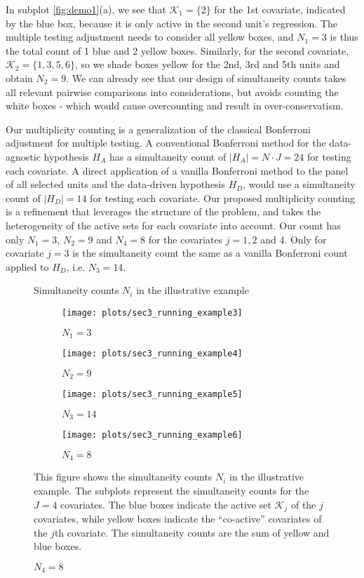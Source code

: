 \documentclass[11pt]{article}
\newcommand\tcaptab[1]{\captionsetup{position=top, font=normalsize, labelfont=bf, textfont=normalfont, justification=centering, margin=0mm, aboveskip=1mm, belowskip=0mm, labelsep=colon, singlelinecheck=false}\caption{#1}}
\newcommand\bnotetab[1]{\captionsetup{position=bottom, font=footnotesize,  textfont=normalfont, margin=1mm, skip=2mm, justification=justified, singlelinecheck=false}\caption*{#1}}
\begin{document}
In subplot \ref{fig:demo1}(a), we see that $\mathcal{K}_1=\{2\}$ for the 1st covariate, indicated by the blue box, because it is only active in the second unit's regression. The multiple testing adjustment needs to consider all yellow boxes, and $N_1=3$ is thus the total count of 1 blue and 2 yellow boxes. Similarly, for the second covariate, $\mathcal{K}_2=\{1,3,5,6\}$, so we shade boxes yellow for the 2nd, 3rd and 5th units and obtain $N_2=9$. We can already see that our design of simultaneity counts takes all relevant pairwise comparisons into considerations, but avoids counting the white boxes - which would cause overcounting and result in over-conservatism. 

Our multiplicity counting is a generalization of the classical Bonferroni adjustment for multiple testing. A conventional Bonferroni method for the data-agnostic hypothesis $H_A$ has a simultaneity count of $|H_A|=N\cdot J=24$ for testing each covariate. A direct application of a vanilla Bonferroni method to the panel of all selected units and the data-driven hypothesis $H_D$, would use a simultaneity count of $|H_D|=14$ for testing each covariate. Our proposed multiplicity counting is a refinement that leverages the structure of the problem, and takes the heterogeneity of the active sets for each covariate into account. Our count has only $N_1=3$, $N_2=9$ and $N_4=8$ for the covariates $j=1,2$ and $4$. Only for covariate $j=3$ is the simultaneity count the same as a vanilla Bonferroni count applied to $H_D$, i.e. $N_3=14$. 

\begin{figure}[t!]
	\tcaptab{Simultaneity counts $N_i$ in the illustrative example}\label{fig:demo1}
	\begin{center}
		\begin{subfigure}[t]{.24\textwidth}
			\texttt{[image: plots/sec3\_running\_example3]}
			\caption{$N_1=3$}
		\end{subfigure}
		\begin{subfigure}[t]{.24\textwidth}
			\texttt{[image: plots/sec3\_running\_example4]}
			\caption{$N_2=9$}
		\end{subfigure}
		\begin{subfigure}[t]{.24\textwidth}
			\texttt{[image: plots/sec3\_running\_example5]}
			\caption{$N_3=14$}
		\end{subfigure}
		\begin{subfigure}[t]{.24\textwidth}
			\texttt{[image: plots/sec3\_running\_example6]}
			\caption{$N_4=8$}
		\end{subfigure}
	\end{center}
	\bnotetab{This figure shows the simultaneity counts $N_i$ in the illustrative example. The subplots represent the simultaneity counts for the $J=4$ covariates. The blue boxes indicate the active set $\mathcal{K}_j$ of the $j$ covariates, while yellow boxes indicate the ``co-active'' covariates of the $j$th covariate. The simultaneity counts are the sum of yellow and blue boxes.}   
\end{figure}
\end{document}
